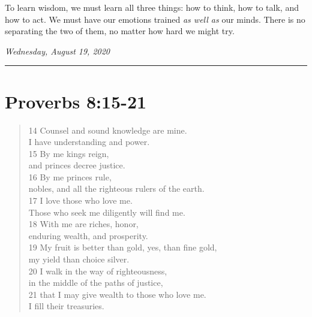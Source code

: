 \documentclass[
]{book}
\begin{document}
To learn wisdom, we must learn all three things: how to think, how to talk, and how to act. We must have our emotions trained \emph{as well as} our minds. There is no separating the two of them, no matter how hard we might try.

\emph{Wednesday, August 19, 2020}

\begin{center}\rule{0.5\linewidth}{0.5pt}\end{center}

\hypertarget{proverbs-815-21}{%
\section{Proverbs 8:15-21}\label{proverbs-815-21}}

\begin{quote}
14 Counsel and sound knowledge are mine.\\
I have understanding and power.\\
15 By me kings reign,\\
and princes decree justice.\\
16 By me princes rule,\\
nobles, and all the righteous rulers of the earth.\\
17 I love those who love me.\\
Those who seek me diligently will find me.\\
18 With me are riches, honor,\\
enduring wealth, and prosperity.\\
19 My fruit is better than gold, yes, than fine gold,\\
my yield than choice silver.\\
20 I walk in the way of righteousness,\\
in the middle of the paths of justice,\\
21 that I may give wealth to those who love me.\\
I fill their treasuries.
\end{quote}
\end{document}
